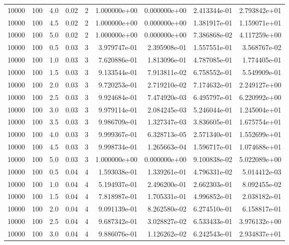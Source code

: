 \begin{tabular}{rrrrrrrrr}
 10000 &  100 &  4.0 &  0.02 &     2 &  1.000000e+00 &  0.000000e+00 &  2.413344e-01 &  2.793842e+01 \\
 10000 &  100 &  4.5 &  0.02 &     2 &  1.000000e+00 &  0.000000e+00 &  1.381917e-01 &  1.159071e+01 \\
 10000 &  100 &  5.0 &  0.02 &     2 &  1.000000e+00 &  0.000000e+00 &  7.386868e-02 &  4.117259e+00 \\
 10000 &  100 &  0.5 &  0.03 &     3 &  3.979747e-01 &  2.395908e-01 &  1.557551e-01 &  3.568767e-02 \\
 10000 &  100 &  1.0 &  0.03 &     3 &  7.620886e-01 &  1.813096e-01 &  4.787085e-01 &  1.774405e-01 \\
 10000 &  100 &  1.5 &  0.03 &     3 &  9.133544e-01 &  7.913811e-02 &  6.758552e-01 &  5.549909e-01 \\
 10000 &  100 &  2.0 &  0.03 &     3 &  9.720253e-01 &  2.719210e-02 &  7.174632e-01 &  2.249127e+00 \\
 10000 &  100 &  2.5 &  0.03 &     3 &  9.924684e-01 &  7.474920e-03 &  6.495797e-01 &  6.220992e+00 \\
 10000 &  100 &  3.0 &  0.03 &     3 &  9.979114e-01 &  2.084245e-03 &  5.246044e-01 &  1.245004e+01 \\
 10000 &  100 &  3.5 &  0.03 &     3 &  9.986709e-01 &  1.327347e-03 &  3.836605e-01 &  1.675754e+01 \\
 10000 &  100 &  4.0 &  0.03 &     3 &  9.999367e-01 &  6.328713e-05 &  2.571340e-01 &  1.552699e+01 \\
 10000 &  100 &  4.5 &  0.03 &     3 &  9.998734e-01 &  1.265663e-04 &  1.596717e-01 &  1.074688e+01 \\
 10000 &  100 &  5.0 &  0.03 &     3 &  1.000000e+00 &  0.000000e+00 &  9.100838e-02 &  5.022089e+00 \\
 10000 &  100 &  0.5 &  0.04 &     4 &  1.593038e-01 &  1.339261e-01 &  4.796331e-02 &  5.014412e-03 \\
 10000 &  100 &  1.0 &  0.04 &     4 &  5.194937e-01 &  2.496200e-01 &  2.662303e-01 &  8.092455e-02 \\
 10000 &  100 &  1.5 &  0.04 &     4 &  7.818987e-01 &  1.705331e-01 &  4.996852e-01 &  2.038182e-01 \\
 10000 &  100 &  2.0 &  0.04 &     4 &  9.091139e-01 &  8.262580e-02 &  6.274510e-01 &  6.158817e-01 \\
 10000 &  100 &  2.5 &  0.04 &     4 &  9.687342e-01 &  3.028827e-02 &  6.533433e-01 &  3.976132e+00 \\
 10000 &  100 &  3.0 &  0.04 &     4 &  9.886076e-01 &  1.126262e-02 &  6.242543e-01 &  2.934837e+01 \\

\end{tabular}
